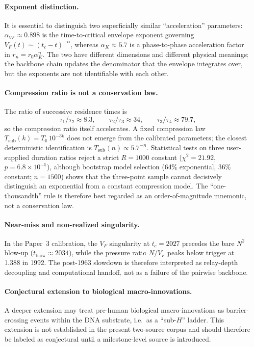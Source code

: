 \documentclass[11pt]{article}
\begin{document}
\paragraph{Exponent distinction.}
It is essential to distinguish two superficially similar ``acceleration'' parameters:
$\alpha_{VF}\approx 0.898$ is the time-to-critical envelope exponent governing
$V_F(t)\sim(t_c-t)^{-\alpha}$,
whereas $\alpha_K\approx 5.7$ is a phase-to-phase acceleration factor in
$r_n=r_0\alpha_K^n$.
The two have different dimensions and different physical meanings;
the backbone chain updates the denominator that the envelope integrates over,
but the exponents are not identifiable with each other.

\paragraph{Compression ratio is not a conservation law.}
The ratio of successive residence times is
\[
\tau_1/\tau_2 \approx 8.3,\qquad
\tau_2/\tau_3 \approx 34,\qquad
\tau_3/\tau_4 \approx 79.7,
\]
so the compression ratio itself accelerates.
A fixed compression law $T_{\mathrm{sub}}(k)=T_0\,10^{-3k}$ does not emerge from
the calibrated parameters; the closest deterministic identification is
$T_{\mathrm{sub}}(n)\propto 5.7^{-n}$.
Statistical tests on three user-supplied duration ratios reject a strict $R=1000$ constant
($\chi^2=21.92$, $p=6.8\times10^{-5}$), although bootstrap model selection
(64\% exponential, 36\% constant; $n=1500$) shows that the three-point sample cannot
decisively distinguish an exponential from a constant compression model.
The ``one-thousandth'' rule is therefore best regarded as an order-of-magnitude mnemonic,
not a conservation law.

\paragraph{Near-miss and non-realized singularity.}
In the Paper~3 calibration, the $V_F$ singularity at $t_c=2027$ precedes the bare $N^2$ blow-up
($t_{\mathrm{blow}}\approx 2034$), while the pressure ratio $N/V_F$ peaks below trigger at 1.388 in 1992.
The post-1963 slowdown is therefore interpreted as relay-depth decoupling and computational handoff,
not as a failure of the pairwise backbone.

\paragraph{Conjectural extension to biological macro-innovations.}
A deeper extension may treat pre-human biological macro-innovations as barrier-crossing events within
the DNA substrate, i.e.\ as a ``sub-$H$'' ladder.
This extension is not established in the present two-source corpus and should therefore be labeled
as conjectural until a milestone-level source is introduced.
\end{document}
